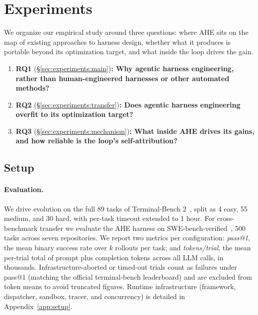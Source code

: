 \section{Experiments}
\label{sec:experiments}

We organize our empirical study around three questions: where AHE sits on the map of existing approaches to harness design, whether what it produces is portable beyond its optimization target, and what inside the loop drives the gain.

\begin{tcolorbox}[
    colback=blue!3,
    colframe=blue!40,
    arc=2pt,
    boxrule=0.5pt,
    left=6pt, right=6pt, top=4pt, bottom=4pt,
    title={\textbf{Research Questions}},
    fonttitle=\bfseries,
    coltitle=black,
    colbacktitle=blue!10
  ]
  \begin{enumerate}
    \setlength{\leftmargini}{1.5em}
    \setlength{\itemsep}{2pt}
    \setlength{\parsep}{0pt}
      \item \textbf{RQ1} (\S\ref{sec:experiments:main})\textbf{: Why agentic harness engineering, rather than human-engineered harnesses or other automated methods?}
      \item \textbf{RQ2} (\S\ref{sec:experiments:transfer})\textbf{: Does agentic harness engineering overfit to its optimization target?}
      \item \textbf{RQ3} (\S\ref{sec:experiments:mechanism})\textbf{: What inside AHE drives its gains, and how reliable is the loop's self-attribution?}
  \end{enumerate}
\end{tcolorbox}

\subsection{Setup}
\label{sec:experiments:setup}

\paragraph{Evaluation.}
\label{sec:experiments:metrics}
We drive evolution on the full 89 tasks of Terminal-Bench 2~\citep{merrillTerminalBenchBenchmarkingAgents2026a}, split as 4 easy, 55 medium, and 30 hard, with per-task timeout extended to 1 hour. For cross-benchmark transfer we evaluate the AHE harness on SWE-bench-verified~\citep{jimenezSWEbenchCanLanguage2023}, 500 tasks across seven repositories. 
We report two metrics per configuration: \textit{pass@1}, the mean binary success rate over $k$ rollouts per task; and \textit{tokens/trial}, the mean per-trial total of prompt plus completion tokens across all LLM calls, in thousands. Infrastructure-aborted or timed-out trials count as failures under pass@1 (matching the official terminal-bench leaderboard) and are excluded from token means to avoid truncated figures. Runtime infrastructure (framework, dispatcher, sandbox, tracer, and concurrency) is detailed in Appendix~\ref{app:setup}.

